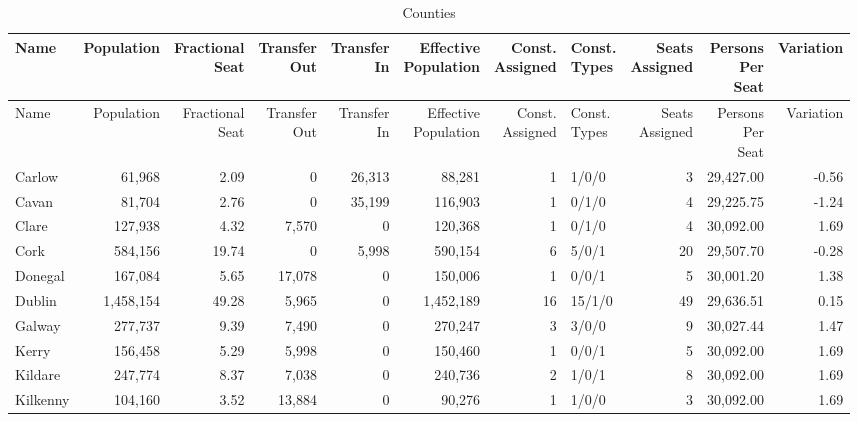 \documentclass[a4paper]{article}
\begin{document}
\begin{longtable}{lrrrrrrlrrr}
\caption{Counties}
\\ \toprule
Name &Population &\shortstack{Fractional\\Seat} &\shortstack{Transfer\\Out} &\shortstack{Transfer\\In} &\shortstack{Effective\\Population} &\shortstack{Const.\\Assigned} &\shortstack{Const.\\Types} &\shortstack{Seats\\Assigned} &\shortstack{Persons\\Per\\Seat} &Variation \\ \midrule
\endfirsthead
\toprule
Name &Population &\shortstack{Fractional\\Seat} &\shortstack{Transfer\\Out} &\shortstack{Transfer\\In} &\shortstack{Effective\\Population} &\shortstack{Const.\\Assigned} &\shortstack{Const.\\Types} &\shortstack{Seats\\Assigned} &\shortstack{Persons\\Per\\Seat} &Variation \\ \midrule
\endhead
\bottomrule
\endfoot
Carlow&61,968& 2.09&0&26,313&88,281&1&1/0/0&3&29,427.00&-0.56\\ 
Cavan&81,704& 2.76&0&35,199&116,903&1&0/1/0&4&29,225.75&-1.24\\ 
Clare&127,938& 4.32&7,570&0&120,368&1&0/1/0&4&30,092.00& 1.69\\ 
Cork&584,156&19.74&0&5,998&590,154&6&5/0/1&20&29,507.70&-0.28\\ 
Donegal&167,084& 5.65&17,078&0&150,006&1&0/0/1&5&30,001.20& 1.38\\ 
Dublin&1,458,154&49.28&5,965&0&1,452,189&16&15/1/0&49&29,636.51& 0.15\\ 
Galway&277,737& 9.39&7,490&0&270,247&3&3/0/0&9&30,027.44& 1.47\\ 
Kerry&156,458& 5.29&5,998&0&150,460&1&0/0/1&5&30,092.00& 1.69\\ 
Kildare&247,774& 8.37&7,038&0&240,736&2&1/0/1&8&30,092.00& 1.69\\ 
Kilkenny&104,160& 3.52&13,884&0&90,276&1&1/0/0&3&30,092.00& 1.69\\ 

\end{longtable}
\end{document}
